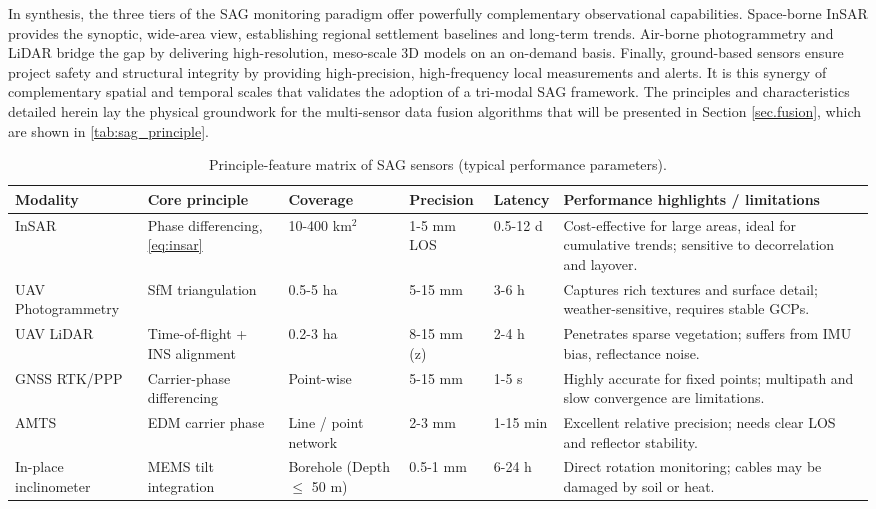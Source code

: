 \documentclass[preprint,11pt,authoryear,3p]{elsarticle}
\begin{document}
In synthesis, the three tiers of the SAG monitoring paradigm offer powerfully complementary observational capabilities. Space-borne InSAR provides the synoptic, wide-area view, establishing regional settlement baselines and long-term trends. Air-borne photogrammetry and LiDAR bridge the gap by delivering high-resolution, meso-scale 3D models on an on-demand basis. Finally, ground-based sensors ensure project safety and structural integrity by providing high-precision, high-frequency local measurements and alerts. It is this synergy of complementary spatial and temporal scales that validates the adoption of a tri-modal SAG framework. The principles and characteristics detailed herein lay the physical groundwork for the multi-sensor data fusion algorithms that will be presented in Section \ref{sec.fusion}, which are shown in \autoref{tab:sag_principle}.

\begin{landscape}
\begin{table}[htbp]
\centering\small
\caption{Principle-feature matrix of SAG sensors (typical performance parameters).}
\label{tab:sag_principle}
\begin{tabular}{@{}p{2.8cm}p{3cm}p{2.8cm}p{2.5cm}p{2.5cm}p{8cm}@{}}
\toprule 
\textbf{Modality} & \textbf{Core principle} & \textbf{Coverage} & \textbf{Precision} & \textbf{Latency} & \textbf{Performance highlights / limitations} \\
\midrule
InSAR & Phase differencing, \autoref{eq:insar} & 10-400 km$^2$ & 1-5 mm LOS & 0.5-12 d & Cost-effective for large areas, ideal for cumulative trends; sensitive to decorrelation and layover. \\
UAV Photogrammetry & SfM triangulation & 0.5-5 ha & 5-15 mm & 3-6 h & Captures rich textures and surface detail; weather-sensitive, requires stable GCPs. \\
UAV LiDAR & Time-of-flight + INS alignment & 0.2-3 ha & 8-15 mm (z) & 2-4 h & Penetrates sparse vegetation; suffers from IMU bias, reflectance noise. \\
GNSS RTK/PPP & Carrier-phase differencing & Point-wise & 5-15 mm & 1-5 s & Highly accurate for fixed points; multipath and slow convergence are limitations. \\
AMTS & EDM carrier phase & Line / point network & 2-3 mm & 1-15 min & Excellent relative precision; needs clear LOS and reflector stability. \\
In-place inclinometer & MEMS tilt integration & Borehole (Depth $\le$ 50 m) & 0.5-1 mm & 6-24 h & Direct rotation monitoring; cables may be damaged by soil or heat. \\
\bottomrule
\end{tabular}
\end{table}
\end{landscape}
\end{document}
